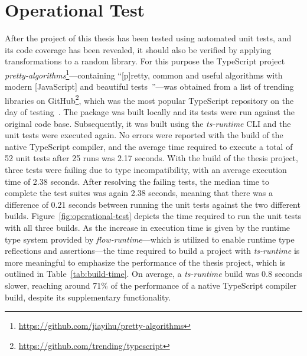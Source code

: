 \section{Operational Test}
\label{sec:operational-test}

After the project of this thesis has been tested using automated unit tests, and its code coverage has been revealed, it should also be verified by applying transformations to a random library. For this purpose the TypeScript project \emph{pretty-algorithms}\footnote{\url{https://github.com/jiayihu/pretty-algorithms}}---containing ``[p]retty, common and useful algorithms with modern [JavaScript] and beautiful tests~\cite{Evaluation:pretty-algorithms}''---was obtained from a list of trending libraries on GitHub\footnote{\url{https://github.com/trending/typescript}}, which was the most popular TypeScript repository on the day of testing~\cite{GitHub:Trending:Archive}. The package was built locally and its tests were run against the original code base. Subsequently, it was built using the \emph{ts-runtime} CLI and the unit tests were executed again. No errors were reported with the build of the native TypeScript compiler, and the average time required to execute a total of 52 unit tests after 25 runs was 2.17 seconds. With the build of the thesis project, three tests were failing due to type incompatibility, with an average execution time of 2.38 seconds. After resolving the failing tests, the median time to complete the test suites was again 2.38 seconds, meaning that there was a difference of 0.21 seconds between running the unit tests against the two different builds. Figure~\ref{fig:operational-test} depicts the time required to run the unit tests with all three builds. As the increase in execution time is given by the runtime type system provided by \emph{flow-runtime}---which is utilized to enable runtime type reflections and assertions---the time required to build a project with \emph{ts-runtime} is more meaningful to emphasize the performance of the thesis project, which is outlined in Table~\ref{tab:build-time}. On average, a \emph{ts-runtime} build was 0.8 seconds slower, reaching around 71\% of the performance of a native TypeScript compiler build, despite its supplementary functionality. 
